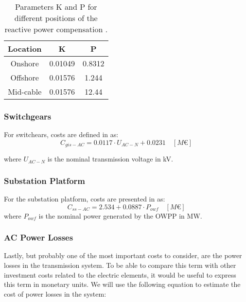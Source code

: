 \documentclass[a4paper,11pt, titlepage, twoside]{article}
\begin{document}
\begin{table}[H]
    \centering
    \begin{tabular}{c|c|c}
    \hline
    \textbf{Location} & \textbf{K} & \textbf{P} \\
    \hline
    Onshore & 0.01049 & 0.8312  \\
    Offshore & 0.01576 & 1.244 \\
    Mid-cable & 0.01576 & 12.44 \\
    \hline
    \end{tabular}
    \caption{Parameters K and P for different positions of the reactive power compensation \cite{paperbase}.}
    \label{tab:parametersshunt}
    \end{table}
\subsubsection{Switchgears}

For switchears, costs are defined in \cite{switchcost} as:
\begin{equation}
    C_{gis-AC} = 0.0117 \cdot U_{AC-N} + 0.0231 \quad \left[M\euro\right]
\end{equation}

where $U_{AC-N}$ is the nominal transmission voltage in kV.
\subsubsection{Substation Platform}
For the substation platform, costs are presented in \cite{chalmers} as:
\begin{equation}
    C_{ss-AC} = 2.534 + 0.0887 \cdot P_{owf} \quad \left[M\euro\right]
\end{equation}
where $P_{owf}$ is the nominal power generated by the OWPP in MW.

\subsubsection{AC Power Losses}
Lastly, but probably one of the most important costs to consider, are the power losses in the transmission system. To be able to compare this term with other investment costs related to the electric elements,
it would be useful to express this term in monetary units. We will use the following equation to estimate the cost of power losses in the system:
\end{document}
